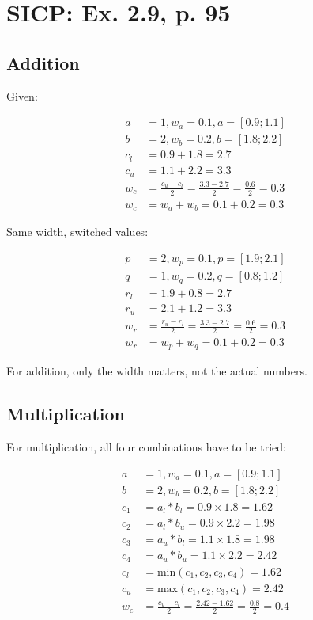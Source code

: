\documentclass[a4paper]{scrartcl}
\begin{document}
\setlength\parindent{0pt}

\section*{SICP: Ex. 2.9, p. 95}

\subsection*{Addition}

Given:

\begin{align}
a &= 1, w_a = 0.1, a = [0.9;1.1] \\
b &= 2, w_b = 0.2, b = [1.8;2.2] \\
c_l &= 0.9 + 1.8 = 2.7 \\
c_u &= 1.1 + 2.2 = 3.3 \\
w_c &= \frac{c_u - c_l}{2} = \frac{3.3 - 2.7}{2} = \frac{0.6}{2} = 0.3 \\
w_c &= w_a + w_b = 0.1 + 0.2 = 0.3
\end{align}

Same width, switched values:

\begin{align}
p &= 2, w_p = 0.1, p = [1.9;2.1] \\
q &= 1, w_q = 0.2, q = [0.8;1.2] \\
r_l &= 1.9 + 0.8 = 2.7 \\
r_u &= 2.1 + 1.2 = 3.3 \\
w_r &= \frac{r_u - r_l}{2} = \frac{3.3 - 2.7}{2} = \frac{0.6}{2} = 0.3 \\
w_r &= w_p + w_q = 0.1 + 0.2 = 0.3
\end{align}

For addition, only the width matters, not the actual numbers.

\subsection*{Multiplication}

For multiplication, all four combinations have to be tried:

\begin{align}
a &= 1, w_a = 0.1, a = [0.9;1.1] \\
b &= 2, w_b = 0.2, b = [1.8;2.2] \\
c_1 &= a_l * b_l = 0.9 \times 1.8 = 1.62 \\
c_2 &= a_l * b_u = 0.9 \times 2.2 = 1.98 \\
c_3 &= a_u * b_l = 1.1 \times 1.8 = 1.98 \\
c_4 &= a_u * b_u = 1.1 \times 2.2 = 2.42 \\
c_l &= \text{min}(c_1, c_2, c_3, c_4) = 1.62 \\
c_u &= \text{max}(c_1, c_2, c_3, c_4) = 2.42 \\
w_c &= \frac{c_u - c_l}{2} = \frac{2.42 - 1.62}{2} = \frac{0.8}{2} = 0.4
\end{align}
\end{document}

